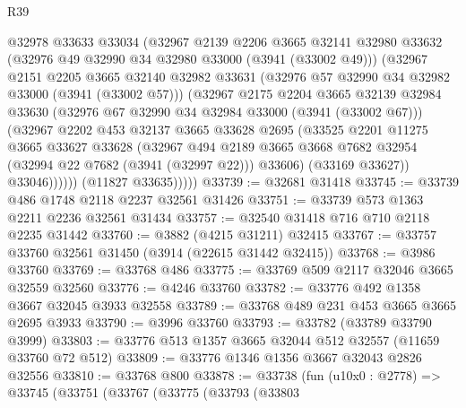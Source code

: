 \begin{lexlean}{R39}
\begin{coremodule}
                @32978
                @33633
                @33034
                (@32967
                  @2139
                  @2206
                  @3665
                  @32141
                  @32980
                  @33632
                  (@32976 @49 @32990 @34 @32980 @33000 (@3941 (@33002 @49)))
                  (@32967
                    @2151
                    @2205
                    @3665
                    @32140
                    @32982
                    @33631
                    (@32976 @57 @32990 @34 @32982 @33000 (@3941 (@33002 @57)))
                    (@32967
                      @2175
                      @2204
                      @3665
                      @32139
                      @32984
                      @33630
                      (@32976 @67 @32990 @34 @32984 @33000 (@3941 (@33002 @67)))
                      (@32967
                        @2202
                        @453
                        @32137
                        @3665
                        @33628
                        @2695
                        (@33525
                          @2201
                          @11275
                          @3665
                          @33627
                          @33628
                          (@32967
                            @494
                            @2189
                            @3665
                            @3668
                            @7682
                            @32954
                            (@32994 @22 @7682 (@3941 (@32997 @22)))
                            @33606)
                          (@33169 @33627))
                        @33046))))))
            (@11827 @33635)))))
@33739 := @32681 @31418
@33745 := @33739 @486 @1748 @2118 @2237 @32561 @31426
@33751 := @33739 @573 @1363 @2211 @2236 @32561 @31434
@33757 := @32540 @31418 @716 @710 @2118 @2235 @31442
@33760 := @3882 (@4215 @31211) @32415
@33767 := @33757 @33760 @32561 @31450 (@3914 (@22615 @31442 @32415))
@33768 := @3986 @33760
@33769 := @33768 @486
@33775 := @33769 @509 @2117 @32046 @3665 @32559 @32560
@33776 := @4246 @33760
@33782 := @33776 @492 @1358 @3667 @32045 @3933 @32558
@33789 := @33768 @489 @231 @453 @3665 @3665 @2695 @3933
@33790 := @3996 @33760
@33793 := @33782 (@33789 @33790 @3999)
@33803 := @33776 @513 @1357 @3665 @32044 @512 @32557 (@11659 @33760 @72 @512)
@33809 := @33776 @1346 @1356 @3667 @32043 @2826 @32556
@33810 := @33768 @800
@33878 := @33738
    (fun (u10x0 : @2778) =>
    @33745
      (@33751
        (@33767
          (@33775
            (@33793
              (@33803

\end{coremodule}
\end{lexlean}
